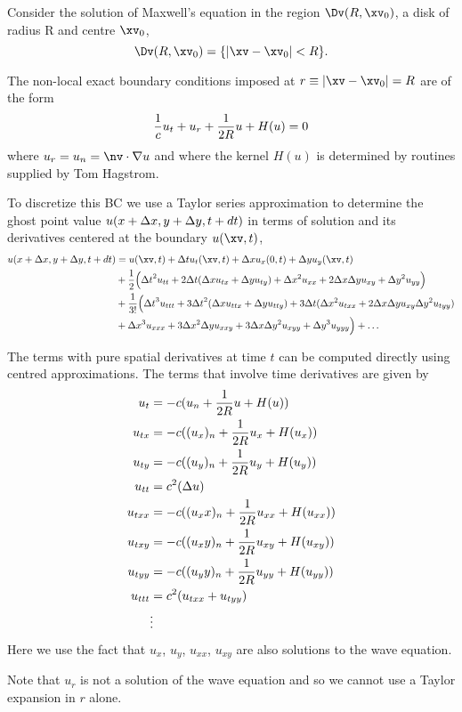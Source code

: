 Consider the solution of Maxwell's equation in the region $\Dv(R,\xv_0)$, a disk of radius R and centre $\xv_0$, 
$$
   \Dv(R,\xv_0) = \{ | \xv-\xv_0 | < R \}.
$$


The non-local exact boundary conditions imposed at $r\equiv|\xv-\xv_0|=R$ are of the form
\begin{align*}
   {1\over c} u_t + u_r + {1\over 2R} u  + H(u) = 0 
\end{align*}
where $u_r = u_n = \nv\cdot\grad u$ and where
the kernel $H(u)$ is determined by routines supplied by Tom Hagstrom.


To discretize this BC we use a Taylor series approximation to determine the
ghost point value $u(x+\Delta x,y+\Delta y, t+dt)$ in terms of solution and its derivatives centered at 
the boundary $u(\xv,t)$,
\begin{align*}
   u(x+\dx,y+\dy, t+dt) &= u(\xv,t) + \dt u_t(\xv,t) + \dx u_x(0,t) + \dy u_y(\xv,t) \\
   & + {1\over 2}\Big( \dt^2 u_{tt} + 2\dt( \dx u_{tx} + \dy u_{ty} ) 
                    + \dx^2 u_{xx} + 2\dx\dy u_{xy} + \dy^2 u_{yy} \Big)  \\
   & + {1\over 3!} \Big( \dt^3 u_{ttt} + 3\dt^2( \dx u_{ttx} + \dy u_{tty} ) 
                 + 3\dt( \dx^2 u_{txx} + 2\dx\dy u_{xy} \dy^2 u_{tyy} )  \\
       &             + \dx^3 u_{xxx} + 3\dx^2\dy u_{xxy}+ 3\dx\dy^2 u_{xyy} + \dy^3 u_{yyy} \Big) + \ldots
\end{align*}


The terms with pure spatial derivatives at time $t$ can be computed directly using centred approximations.
The terms that involve time derivatives are given by
\begin{align*}
    u_t  & = -c ( u_n + {1\over 2R} u  + H(u) )  \\
    u_{tx} & = -c ( (u_x)_n + {1\over 2R} u_x  + H(u_x) )  \\
    u_{ty} & = -c ( (u_y)_n + {1\over 2R} u_y  + H(u_y) )  \\
    u_{tt} &= c^2( \Delta u ) \\
    u_{txx} & = -c ( (u_xx)_n + {1\over 2R} u_{xx}  + H(u_{xx}) )  \\
    u_{txy} & = -c ( (u_xy)_n + {1\over 2R} u_{xy}  + H(u_{xy}) )  \\
    u_{tyy} & = -c ( (u_yy)_n + {1\over 2R} u_{yy}  + H(u_{yy}) )  \\
    u_{ttt} &= c^2( u_{txx} + u_{tyy} ) \\
     & \vdots 
\end{align*}
Here we use the fact that $u_x$, $u_y$, $u_{xx}$, $u_{xy}$ are also solutions to the wave equation.

Note that $u_r$ is not a solution of the wave equation and so we cannot use a Taylor expansion
in $r$ alone. 